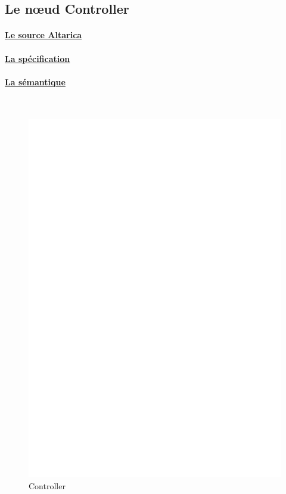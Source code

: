   \subsection{Le n\oe{}ud Controller}
   
    \paragraph{\underline{Le source Altarica\\}}
    
    
    \paragraph{\underline{La spécification\\}}
    
    
    \paragraph{\underline{La sémantique\\}}
    ~\\
\begin{figure}[!ht]
     \begin{center}
      \includegraphics[width=16cm]{../src/altarica/Controller.eps}
      \caption{Controller}
     \end{center}
    \end{figure}

